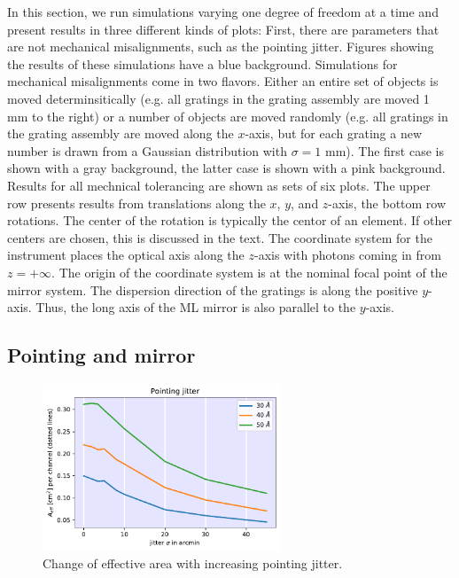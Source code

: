 \documentclass[]{spie}  %
\begin{document}
In this section, we run simulations varying one degree of freedom at a
time and present results in three different kinds of plots: First,
there are parameters that are not mechanical misalignments, such as
the pointing jitter. Figures showing the results of these simulations
have a blue background. Simulations for mechanical misalignments come
in two flavors. Either an entire set of objects is moved
determinsitically (e.g. all gratings in the grating assembly are moved
1 mm to the right) or a number of objects are moved randomly (e.g. all
gratings in the grating assembly are moved along the $x$-axis, but for
each grating a new number is drawn from a Gaussian distribution with
$\sigma=1$ mm). The first case is shown with a gray background, the
latter case is shown with a pink background. Results for all mechnical
tolerancing are shown as sets of six plots. The upper row presents
results from translations along the $x$, $y$, and $z$-axis, the bottom
row rotations. The center of the rotation is typically the centor of
an element. If other centers are chosen, this is discussed in the
text. The coordinate system for the instrument places the optical axis
along the $z$-axis with photons coming in from $z=+\infty$. The origin
of the coordinate system is at the nominal focal point of the mirror
system. The dispersion direction of the gratings is along the positive
$y$-axis. Thus, the long axis of the ML mirror is also parallel to the
$y$-axis.

\subsection{Pointing and mirror}
\begin{figure} [ht]
  \begin{center}
    \includegraphics[height=5cm]{jitter.pdf}
  \end{center}
  \caption
      { \label{fig:jitter}Change of effective area with increasing pointing jitter. 
}
\end{figure}
\end{document}
